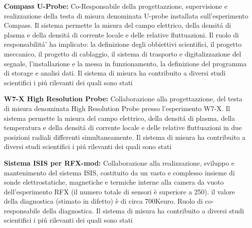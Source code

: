 \begin{enumerate}[label={[Q\arabic*]}]
  \item \textbf{Compass U-Probe:}  Co-Responsabile della progettazzione, 
  supervisione e realizzazione della testa di misura
  denominata U-probe installata sull'esperimento Compass.
  Il sistema permette la misura del campo elettrico,  della
  densit{\'a} di plasma e della densit{\'a} di corrente locale e delle
  relative fluttuazioni.  Il
  ruolo di responsabilit{\'a'} ha implicato: la definizione degli
  obbiettivi scientifici, il progetto meccanico, il progetto di
  cablaggio,
  il sistema di trasporto e digitalizzazione
  del segnale, l'installazione e la messa in funzionamento,  la
  definizione del programma di storage e analisi dati.   Il sistema di
  misura ha contribuito a diversi studi scientifici i pi{\'u}
  rilevanti dei quali sono stati \cite{Kovarik:2017bp, Kovarik:2014tq, Spolaore:2016bo}

  \item \textbf{W7-X High Resolution Probe:}  Collaborazione alla progettazzione, 
  del testa di misura denominata High Resolution Probe presso
  l'esperimento W7-X. 
  Il sistema permette la misura del campo elettrico,  della
  densit{\'a} di plasma, della temperatura e della densit{\'a} di corrente locale e delle
  relative fluttuazioni in due posizioni radiali differenti simultaneamente.    Il sistema di
  misura ha contribuito a diversi studi scientifici i pi{\'u}
  rilevanti dei quali sono stati \cite{spolaore:jinstr2019,
    Agostinetti:2018bm}

  \item \textbf{Sistema ISIS per RFX-mod:}  Collaborazione alla
    realizzazione,  sviluppo e mantenimento del sistema ISIS,
    costituito da un vasto e complesso insieme di sonde
    elettrostatiche,
    magnetiche e termiche interne alla camera da vuoto
    dell'esperimento RFX
    (il numero totale di sensori è superiore a 250).
    il valore della diagnostica (stimato in difetto) è di circa
    700Keuro. Ruolo di co-responsabile della diagnostica. Il sistema di
  misura ha contribuito a diversi studi scientifici i pi{\'u}
  rilevanti dei quali sono stati \cite{Rea:2015he,Vianello:2015ek, Agostini:2014fk,Spizzo:2014jn, Vianello:2013jt}

\end{enumerate}

